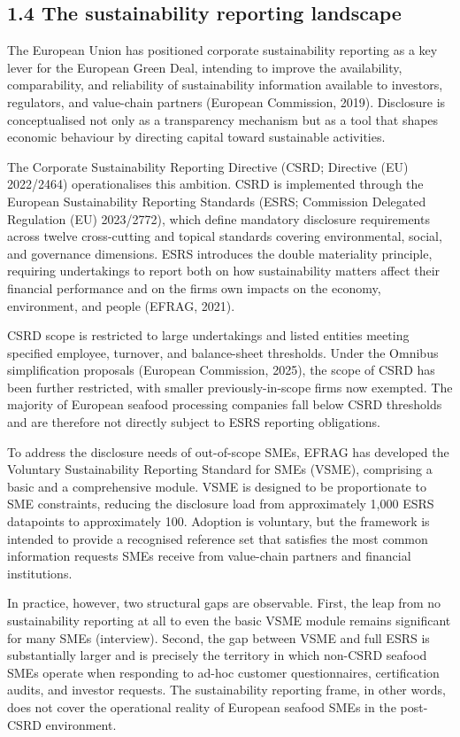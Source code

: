 \documentclass[
]{article}
\begin{document}
\subsection{1.4 The sustainability reporting
landscape}\label{the-sustainability-reporting-landscape}

The European Union has positioned corporate sustainability reporting as
a key lever for the European Green Deal, intending to improve the
availability, comparability, and reliability of sustainability
information available to investors, regulators, and value-chain partners
(European Commission, 2019). Disclosure is conceptualised not only as a
transparency mechanism but as a tool that shapes economic behaviour by
directing capital toward sustainable activities.

The Corporate Sustainability Reporting Directive (CSRD; Directive (EU)
2022/2464) operationalises this ambition. CSRD is implemented through
the European Sustainability Reporting Standards (ESRS; Commission
Delegated Regulation (EU) 2023/2772), which define mandatory disclosure
requirements across twelve cross-cutting and topical standards covering
environmental, social, and governance dimensions. ESRS introduces the
double materiality principle, requiring undertakings to report both on
how sustainability matters affect their financial performance and on the
firm\textquotesingle s own impacts on the economy, environment, and
people (EFRAG, 2021).

CSRD scope is restricted to large undertakings and listed entities
meeting specified employee, turnover, and balance-sheet thresholds.
Under the Omnibus simplification proposals (European Commission, 2025),
the scope of CSRD has been further restricted, with smaller
previously-in-scope firms now exempted. The majority of European seafood
processing companies fall below CSRD thresholds and are therefore not
directly subject to ESRS reporting obligations.

To address the disclosure needs of out-of-scope SMEs, EFRAG has
developed the Voluntary Sustainability Reporting Standard for SMEs
(VSME), comprising a basic and a comprehensive module. VSME is designed
to be proportionate to SME constraints, reducing the disclosure load
from approximately 1,000 ESRS datapoints to approximately 100. Adoption
is voluntary, but the framework is intended to provide a recognised
reference set that satisfies the most common information requests SMEs
receive from value-chain partners and financial institutions.

In practice, however, two structural gaps are observable. First, the
leap from no sustainability reporting at all to even the basic VSME
module remains significant for many SMEs (interview). Second, the gap
between VSME and full ESRS is substantially larger and is precisely the
territory in which non-CSRD seafood SMEs operate when responding to
ad-hoc customer questionnaires, certification audits, and investor
requests. The sustainability reporting frame, in other words, does not
cover the operational reality of European seafood SMEs in the post-CSRD
environment.
\end{document}
